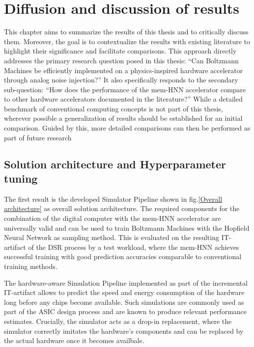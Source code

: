 \chapter{Diffusion and discussion of results}

This chapter aims to summarize the results of this thesis and to critically discuss them.
Moreover, the goal is to contextualize the results with existing literature to highlight their significance and facilitate comparisons.
This approach directly addresses the primary research question posed in this thesis: ``Can Boltzmann Machines be efficiently implemented on a physics-inspired hardware accelerator through analog noise injection?''
It also specifically responds to the secondary sub-question: ``How does the performance of the \ac{mem-HNN} accelerator compare to other hardware accelerators documented in the literature?''
While a detailed benchmark of conventional computing concepts is not part of this thesis, wherever possible a generalization of results should be established for an initial comparison.
Guided by this, more detailed comparisons can then be performed as part of future research

\section{Solution architecture and Hyperparameter tuning}

The first result is the developed Simulator Pipeline shown in fig.\ref{Overall architecture} as overall solution architecture. 
The required components for the combination of the digital computer with the \ac{mem-HNN} accelerator 
are universally valid and can be used to train Boltzmann Machines with the Hopfield Neural Network as sampling method. 
This is evaluated on the resulting \ac{IT}-artifact of the \ac{DSR} process by a test workload, where the \ac{mem-HNN}
achieves successful training with good prediction accuracies comparable to conventional training methods. 

The hardware-aware Simulation Pipeline implemented as part of the incremental \ac{IT}-artifact allows to predict the speed and energy consumption of the hardware long before any chips become available.
Such simulations are commonly used as part of the \ac{ASIC} design process and are known to produce relevant performance estimates.
Crucially, the simulator acts as a drop-in replacement, where the simulator correctly imitates the hardware's components and can be replaced by the actual hardware once it becomes availbale.

